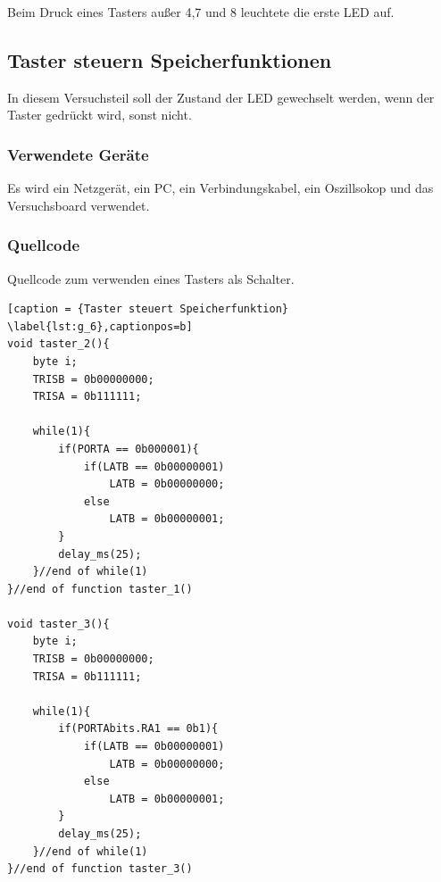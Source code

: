 \documentclass[12pt,a4paper]{article}
\begin{document}
Beim Druck eines Tasters außer 4,7 und 8 leuchtete die erste LED auf.

\subsection{Taster steuern Speicherfunktionen}

In diesem Versuchsteil soll der Zustand der LED gewechselt werden, wenn der Taster gedrückt wird, sonst nicht.

\subsubsection*{Verwendete Geräte}

Es wird ein Netzgerät, ein PC, ein Verbindungskabel, ein Oszillsokop und das Versuchsboard verwendet.

\subsubsection*{Quellcode}

Quellcode zum verwenden eines Tasters als Schalter.

\lstset{language=C, basicstyle=\tiny}
\begin{lstlisting}[caption = {Taster steuert Speicherfunktion} \label{lst:g_6},captionpos=b]
void taster_2(){
	byte i;
	TRISB = 0b00000000;
	TRISA = 0b111111;
	
	while(1){
		if(PORTA == 0b000001){
			if(LATB == 0b00000001)
				LATB = 0b00000000;
			else
				LATB = 0b00000001;
		}
		delay_ms(25);
	}//end of while(1)
}//end of function taster_1()

void taster_3(){
	byte i;
	TRISB = 0b00000000;
	TRISA = 0b111111;
	
	while(1){
		if(PORTAbits.RA1 == 0b1){
			if(LATB == 0b00000001)
				LATB = 0b00000000;
			else
				LATB = 0b00000001;
		}
		delay_ms(25);
	}//end of while(1)
}//end of function taster_3()
\end{lstlisting}
\end{document}
